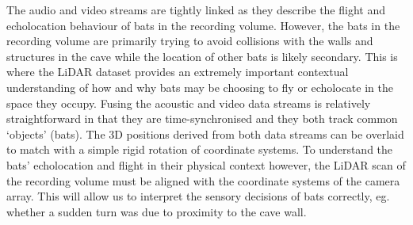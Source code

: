 \documentclass[
]{book}
\begin{document}
The audio and video streams are tightly linked as they describe the flight and echolocation behaviour of bats in the recording volume. However, the bats in the recording volume are primarily trying to avoid collisions with the walls and structures in the cave while the location of other bats is likely secondary. This is where the LiDAR dataset provides an extremely important contextual understanding of how and why bats may be choosing to fly or echolocate in the space they occupy. Fusing the acoustic and video data streams is relatively straightforward in that they are time-synchronised and they both track common `objects' (bats). The 3D positions derived from both data streams can be overlaid to match with a simple rigid rotation of coordinate systems. To understand the bats' echolocation and flight in their physical context however, the LiDAR scan of the recording volume must be aligned with the coordinate systems of the camera array. This will allow us to interpret the sensory decisions of bats correctly, eg. whether a sudden turn was due to proximity to the cave wall.
\end{document}
